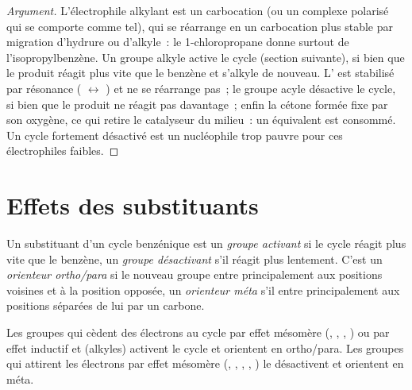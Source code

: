 \begin{proof}[Argument]
L'électrophile alkylant est un carbocation (ou un complexe polarisé qui se comporte comme tel),
qui se réarrange en un carbocation plus stable par migration d'hydrure ou d'alkyle~: le
1-chloropropane donne surtout de l'isopropylbenzène. Un groupe alkyle active le cycle (section
suivante), si bien que le produit réagit plus vite que le benzène et s'alkyle de nouveau. L' est stabilisé par résonance ( $\leftrightarrow$ ) et ne se
réarrange pas~; le groupe acyle désactive le cycle, si bien que le produit ne réagit pas
davantage~; enfin la cétone formée fixe  par son oxygène, ce qui retire le catalyseur
du milieu~: un équivalent est consommé. Un cycle fortement désactivé est un nucléophile trop
pauvre pour ces électrophiles faibles.
\end{proof}

\section{Effets des substituants}

\begin{definition}\label{def:b2:aromatic-substitution:directing}
Un substituant d'un cycle benzénique est un \emph{groupe activant} si le
cycle réagit plus vite que le benzène, un \emph{groupe désactivant} s'il
réagit plus lentement. C'est un \emph{orienteur ortho/para} si le
nouveau groupe entre principalement aux positions voisines et à la position opposée, un
\emph{orienteur méta} s'il entre principalement aux positions
séparées de lui par un carbone.
\end{definition}

\begin{proposition}\label{prop:b2:aromatic-substitution:directing}
Les groupes qui cèdent des électrons au cycle par effet mésomère (, , ,
) ou par effet inductif et  (alkyles) activent le cycle et orientent
en ortho/para. Les groupes qui attirent les électrons par effet mésomère (, , ,
, ) le désactivent et orientent en méta.
\end{proposition}

